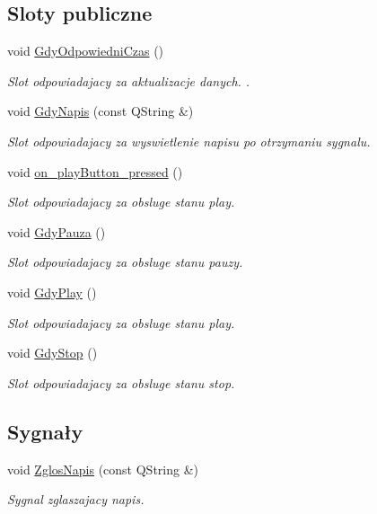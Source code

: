 \subsection*{Sloty publiczne}
\begin{DoxyCompactItemize}
\item 
void \hyperlink{class_okno_glowne_a2a49d3696ef8a42325313842768f2c92}{Gdy\-Odpowiedni\-Czas} ()
\begin{DoxyCompactList}\small\item\em Slot odpowiadajacy za aktualizacje danych. . \end{DoxyCompactList}\item 
void \hyperlink{class_okno_glowne_a2a59f13292adfead4ac821780220044a}{Gdy\-Napis} (const Q\-String \&)
\begin{DoxyCompactList}\small\item\em Slot odpowiadajacy za wyswietlenie napisu po otrzymaniu sygnalu. \end{DoxyCompactList}\item 
void \hyperlink{class_okno_glowne_a8ec594954a3196b17d42ff02be825068}{on\-\_\-play\-Button\-\_\-pressed} ()
\begin{DoxyCompactList}\small\item\em Slot odpowiadajacy za obsluge stanu play. \end{DoxyCompactList}\item 
void \hyperlink{class_okno_glowne_a04dc59a4b071d2ccdf500b19b9df7bb9}{Gdy\-Pauza} ()
\begin{DoxyCompactList}\small\item\em Slot odpowiadajacy za obsluge stanu pauzy. \end{DoxyCompactList}\item 
void \hyperlink{class_okno_glowne_a0413b5b46bb0941b8f7ee36f92067e17}{Gdy\-Play} ()
\begin{DoxyCompactList}\small\item\em Slot odpowiadajacy za obsluge stanu play. \end{DoxyCompactList}\item 
void \hyperlink{class_okno_glowne_a10758539b4c164b19503857625d71222}{Gdy\-Stop} ()
\begin{DoxyCompactList}\small\item\em Slot odpowiadajacy za obsluge stanu stop. \end{DoxyCompactList}\end{DoxyCompactItemize}
\subsection*{Sygnały}
\begin{DoxyCompactItemize}
\item 
void \hyperlink{class_okno_glowne_aa602a0c5a940f0af4ab7390bfc1a4b9d}{Zglos\-Napis} (const Q\-String \&)
\begin{DoxyCompactList}\small\item\em Sygnal zglaszajacy napis. \end{DoxyCompactList}\end{DoxyCompactItemize}
